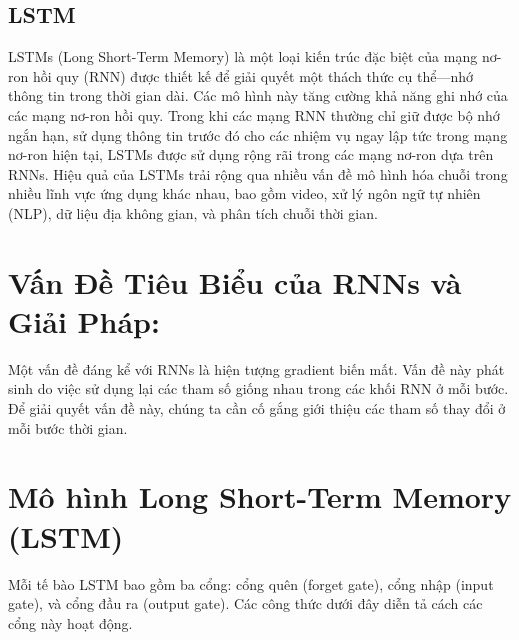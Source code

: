 \documentclass[conference]{IEEEtran}
\begin{document}
\subsection{LSTM}
LSTMs (Long Short-Term Memory) là một loại kiến trúc đặc biệt của mạng nơ-ron hồi quy (RNN) được thiết kế để giải quyết một thách thức cụ thể—nhớ thông tin trong thời gian dài. Các mô hình này tăng cường khả năng ghi nhớ của các mạng nơ-ron hồi quy. Trong khi các mạng RNN thường chỉ giữ được bộ nhớ ngắn hạn, sử dụng thông tin trước đó cho các nhiệm vụ ngay lập tức trong mạng nơ-ron hiện tại, LSTMs được sử dụng rộng rãi trong các mạng nơ-ron dựa trên RNNs. Hiệu quả của LSTMs trải rộng qua nhiều vấn đề mô hình hóa chuỗi trong nhiều lĩnh vực ứng dụng khác nhau, bao gồm video, xử lý ngôn ngữ tự nhiên (NLP), dữ liệu địa không gian, và phân tích chuỗi thời gian.
\section*{Vấn Đề Tiêu Biểu của RNNs và Giải Pháp:}
Một vấn đề đáng kể với RNNs là hiện tượng gradient biến mất. Vấn đề này phát sinh do việc sử dụng lại các tham số giống nhau trong các khối RNN ở mỗi bước. Để giải quyết vấn đề này, chúng ta cần cố gắng giới thiệu các tham số thay đổi ở mỗi bước thời gian.

\section*{Mô hình Long Short-Term Memory (LSTM)}

Mỗi tế bào LSTM bao gồm ba cổng: cổng quên (forget gate), cổng nhập (input gate), và cổng đầu ra (output gate). Các công thức dưới đây diễn tả cách các cổng này hoạt động.
\end{document}
